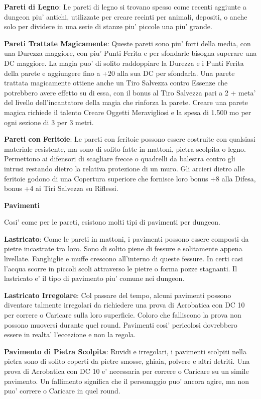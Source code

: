 \documentclass[a4paper,11pt,twoside,openany]{dndbook}
\begin{document}
{\textbf{Pareti di Legno}: Le pareti di legno si trovano spesso come recenti aggiunte a dungeon piu' antichi, utilizzate per creare recinti per animali, depositi, o anche solo per dividere in una serie di stanze piu' piccole una piu' grande.

\textbf{Pareti Trattate Magicamente}: Queste pareti sono piu' forti della media, con una Durezza maggiore, con piu' Punti Ferita e per sfondarle bisogna superare una DC maggiore. La magia puo' di solito raddoppiare la Durezza e i Punti Ferita della parete e aggiungere fino a +20 alla sua DC per sfondarla. Una parete trattata magicamente ottiene anche un Tiro Salvezza contro Essenze che potrebbero avere effetto su di essa, con il bonus al Tiro Salvezza pari a 2 + meta' del livello dell'incantatore della magia che rinforza la parete. Creare una parete magica richiede il talento Creare Oggetti Meravigliosi e la spesa di 1.500 mo per ogni sezione di 3 per 3 metri.

\textbf{Pareti con Feritoie}: Le pareti con feritoie possono essere costruite con qualsiasi materiale resistente, ma sono di solito fatte in mattoni, pietra scolpita o legno. Permettono ai difensori di scagliare frecce o quadrelli da balestra contro gli intrusi restando dietro la relativa protezione di un muro. Gli arcieri dietro alle feritoie godono di una Copertura superiore che fornisce loro bonus +8 alla Difesa, bonus +4 ai Tiri Salvezza su Riflessi.

\textbf{Pavimenti}

Cosi' come per le pareti, esistono molti tipi di pavimenti per dungeon.

\textbf{Lastricato}: Come le pareti in mattoni, i pavimenti possono essere composti da pietre incastrate tra loro. Sono di solito piene di fessure e solitamente appena livellate. Fanghiglie e muffe crescono all'interno di queste fessure. In certi casi l'acqua scorre in piccoli scoli attraverso le pietre o forma pozze stagnanti. Il lastricato e' il tipo di pavimento piu' comune nei dungeon.

\textbf{Lastricato Irregolare}: Col passare del tempo, alcuni pavimenti possono diventare talmente irregolari da richiedere una prova di Acrobatica con DC 10 per correre o Caricare sulla loro superficie. Coloro che falliscono la prova non possono muoversi durante quel round. Pavimenti cosi' pericolosi dovrebbero essere in realta' l'eccezione e non la regola.

\textbf{Pavimento di Pietra Scolpita}: Ruvidi e irregolari, i pavimenti scolpiti nella pietra sono di solito coperti da pietre smosse, ghiaia, polvere e altri detriti. Una prova di Acrobatica con DC 10 e' necessaria per correre o Caricare su un simile pavimento. Un fallimento significa che il personaggio puo' ancora agire, ma non puo' correre o Caricare in quel round.

}
\end{document}
